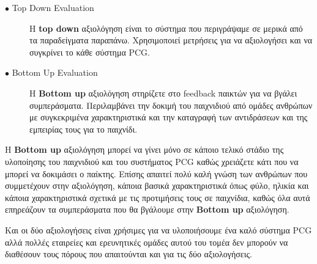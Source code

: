 \begin{description}
  \item[$\bullet$ Top Down Evaluation] Η \textbf{top down} αξιολόγηση είναι το σύστημα που περιγράψαμε σε μερικά από τα παραδείγματα παραπάνω. Χρησιμοποιεί μετρήσεις για να αξιολογήσει και να συγκρίνει το κάθε σύστημα PCG.
  \item[$\bullet$ Bottom Up Evaluation] Η \textbf{Bottom up} αξιολόγηση στηρίζετε στο feedback παικτών για να βγάλει συμπεράσματα. Περιλαμβάνει την δοκιμή του παιχνιδιού από ομάδες ανθρώπων με συγκεκριμένα χαρακτηριστικά και την καταγραφή των αντιδράσεων και της εμπειρίας τους για το παιχνίδι.
\end{description}
\par
Η \textbf{Bottom up} αξιολόγηση μπορεί να γίνει μόνο σε κάποιο τελικό στάδιο της υλοποίησης του παιχνιδιού και του συστήματος PCG καθώς χρειάζετε κάτι που να μπορεί να δοκιμάσει ο παίκτης. Επίσης απαιτεί πολύ καλή γνώση των ανθρώπων που συμμετέχουν στην αξιολόγηση, κάποια βασικά χαρακτηριστικά όπως φύλο, ηλικία και κάποια χαρακτηριστικά σχετικά με τις προτιμήσεις τους σε παιχνίδια, καθώς όλα αυτά επηρεάζουν τα συμπεράσματα που θα βγάλουμε στην \textbf{Bottom up} αξιολόγηση.
\par
Και οι δύο αξιολογήσεις είναι χρήσιμες για να υλοποιήσουμε ένα καλό σύστημα PCG αλλά πολλές εταιρείες και ερευνητικές ομάδες αυτού του τομέα δεν μπορούν να διαθέσουν τους πόρους που απαιτούνται και για τις δύο αξιολογήσεις.





